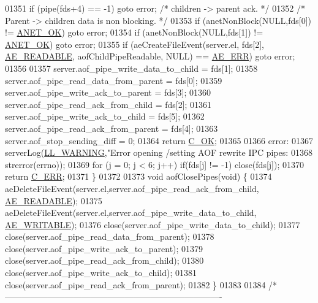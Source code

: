 \begin{DoxyCode}
{{{{{{{{{{{{{{{{{{{{{{01351     \textcolor{keywordflow}{if} (pipe(fds+4) == -1) \textcolor{keywordflow}{goto} error; \textcolor{comment}{/* children -> parent ack. */}
01352     \textcolor{comment}{/* Parent -> children data is non blocking. */}
01353     \textcolor{keywordflow}{if} (anetNonBlock(NULL,fds[0]) != \hyperlink{anet_8h_a25fb91ccc6457153f6d2e21380d4c6cf}{ANET\_OK}) \textcolor{keywordflow}{goto} error;
01354     \textcolor{keywordflow}{if} (anetNonBlock(NULL,fds[1]) != \hyperlink{anet_8h_a25fb91ccc6457153f6d2e21380d4c6cf}{ANET\_OK}) \textcolor{keywordflow}{goto} error;
01355     \textcolor{keywordflow}{if} (aeCreateFileEvent(server.el, fds[2], \hyperlink{ae_8h_a7a9a2162d007d09739955b4e55c65bf3}{AE\_READABLE}, aofChildPipeReadable, NULL) == 
      \hyperlink{ae_8h_aa16dcf7effdf8f8df97f51b1cb51a9df}{AE\_ERR}) \textcolor{keywordflow}{goto} error;
01356 
01357     server.aof\_pipe\_write\_data\_to\_child = fds[1];
01358     server.aof\_pipe\_read\_data\_from\_parent = fds[0];
01359     server.aof\_pipe\_write\_ack\_to\_parent = fds[3];
01360     server.aof\_pipe\_read\_ack\_from\_child = fds[2];
01361     server.aof\_pipe\_write\_ack\_to\_child = fds[5];
01362     server.aof\_pipe\_read\_ack\_from\_parent = fds[4];
01363     server.aof\_stop\_sending\_diff = 0;
01364     \textcolor{keywordflow}{return} \hyperlink{server_8h_a303769ef1065076e68731584e758d3e1}{C\_OK};
01365 
01366 error:
01367     serverLog(\hyperlink{server_8h_a31229b9334bba7d6be2a72970967a14b}{LL\_WARNING},\textcolor{stringliteral}{"Error opening /setting AOF rewrite IPC pipes: %
01368         strerror(errno));
01369     \textcolor{keywordflow}{for} (j = 0; j < 6; j++) \textcolor{keywordflow}{if}(fds[j] != -1) close(fds[j]);
01370     \textcolor{keywordflow}{return} \hyperlink{server_8h_af98ac28d5f4d23d7ed5985188e6fb7d1}{C\_ERR};
01371 \}
01372 
01373 \textcolor{keywordtype}{void} aofClosePipes(\textcolor{keywordtype}{void}) \{
01374     aeDeleteFileEvent(server.el,server.aof\_pipe\_read\_ack\_from\_child,
      \hyperlink{ae_8h_a7a9a2162d007d09739955b4e55c65bf3}{AE\_READABLE});
01375     aeDeleteFileEvent(server.el,server.aof\_pipe\_write\_data\_to\_child,
      \hyperlink{ae_8h_ab6bfb0366ccb6277112d132c2a2bf500}{AE\_WRITABLE});
01376     close(server.aof\_pipe\_write\_data\_to\_child);
01377     close(server.aof\_pipe\_read\_data\_from\_parent);
01378     close(server.aof\_pipe\_write\_ack\_to\_parent);
01379     close(server.aof\_pipe\_read\_ack\_from\_child);
01380     close(server.aof\_pipe\_write\_ack\_to\_child);
01381     close(server.aof\_pipe\_read\_ack\_from\_parent);
01382 \}
01383 
01384 \textcolor{comment}{/* ----------------------------------------------------------------------------}
}}}}}}}}}}}}}}}}}}}}}}}
\end{DoxyCode}
